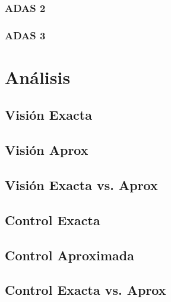 \subsubsection{ADAS 2}

\subsubsection{ADAS 3}


\section{Análisis}

\subsection{Visión Exacta}

\subsection{Visión Aprox}

\subsection{Visión Exacta vs. Aprox}

\subsection{Control Exacta}

\subsection{Control Aproximada}

\subsection{Control Exacta vs. Aprox}